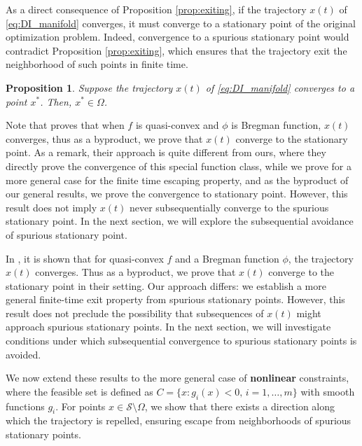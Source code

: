 \documentclass[11pt]{article}
\newtheorem{proposition}{Proposition}[section]
\begin{document}
As a direct consequence of Proposition \ref{prop:exiting}, if the trajectory $x(t)$ of \eqref{eq:DI_manifold} converges, it must converge to a stationary point of the original optimization problem. Indeed, convergence to a spurious stationary point would contradict Proposition \ref{prop:exiting}, which ensures that the trajectory exit the neighborhood of such points in finite time.

\begin{proposition}
    \label{prop:covergent_traj}
    Suppose the trajectory $x(t)$ of \eqref{eq:DI_manifold} converges to a point $x^*$. Then, $x^*\in\Omega$. %
\end{proposition}


Note that \cite[Theorem 4.2]{alvarez2004hessian} proves that when $f$ is quasi-convex and $\phi$ is Bregman function, $x(t)$ converges, thus as a byproduct, we prove that $x(t)$ converge to the stationary point. As a remark, their approach is quite different from ours, where they directly prove the convergence of this special function class, while we prove for a more general case for the finite time escaping property, and as the byproduct of our general results, we prove the convergence to stationary point. 
However, this result does not imply $x(t)$ never subsequentially converge to the spurious stationary point. In the next section, we will explore the subsequential avoidance of  spurious stationary point.

In \cite[Theorem 4.2]{alvarez2004hessian}, it is shown that for quasi-convex $f$ and a Bregman function $\phi$, the trajectory $x(t)$ converges. Thus as a byproduct, we prove that $x(t)$ converge to the stationary point in their setting. Our approach differs: we establish a more general finite-time exit property from spurious stationary points.
However, this result does not preclude the possibility that subsequences of $x(t)$ might approach spurious stationary points. In the next section, we will investigate conditions under which subsequential convergence to spurious stationary points is avoided.

We now extend these results to the more general case of \textbf{nonlinear} constraints, where the feasible set is defined as $C = \{ x : g_i(x) < 0, \, i = 1, \dots, m \}$ with smooth functions $g_i$. For points $x \in \mathcal{S} \setminus \Omega$, we show that there exists a direction along which the trajectory is repelled, ensuring escape from neighborhoods of spurious stationary points.
\end{document}
